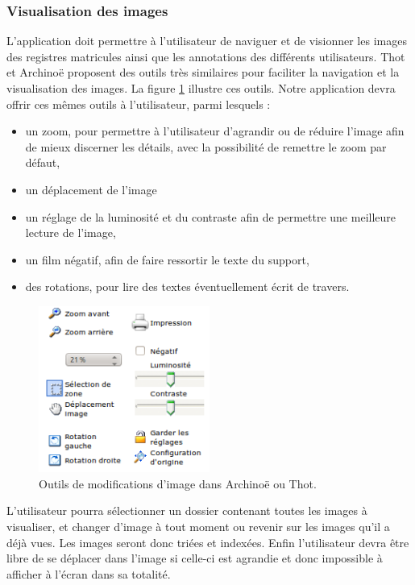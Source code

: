 \documentclass[a4paper]{article}
\begin{document}
\subsubsection{Visualisation des images}

	L'application doit permettre \`a l'utilisateur de naviguer et de visionner les images des registres matricules ainsi que les annotations des diff\'erents utilisateurs. Thot et Archino\"e proposent des outils tr\`es similaires pour faciliter la navigation et la visualisation des images. La figure \ref{fig:modifImage} illustre ces outils. Notre application devra offrir ces m\^emes outils \`a l'utilisateur, parmi lesquels :
\begin{itemize}
\item un zoom, pour permettre \`a l'utilisateur d'agrandir ou de r\'eduire l'image afin de mieux discerner les d\'etails, avec la possibilit\'e de remettre le zoom par d\'efaut,
\item un d\'eplacement de l'image
\item un r\'eglage de la luminosit\'e et du contraste afin de permettre une meilleure lecture de l'image,
\item un film n\'egatif, afin de faire ressortir le texte du support,
\item des rotations, pour lire des textes \'eventuellement \'ecrit de travers.
\end{itemize}

\begin{figure}[H]
\centering
\includegraphics[width=0.5\textwidth]{modification_image_archinoe.png}
\caption{\label{fig:modifImage}Outils de modifications d'image dans Archino\"e ou Thot.}
\end{figure}

	L'utilisateur pourra s\'electionner un dossier contenant toutes les images \`a visualiser, et changer d'image \`a tout moment ou revenir sur les images qu'il a d\'ej\`a vues. Les images seront donc tri\'ees et index\'ees.
Enfin l'utilisateur devra \^etre libre de se d\'eplacer dans l'image si celle-ci est agrandie et donc impossible \`a afficher \`a l'\'ecran dans sa totalit\'e.
\\
\end{document}
